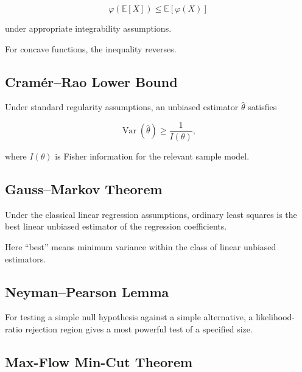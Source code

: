 \[
\boxed{
\varphi(
\mathbb{E}[X]
)
\leq
\mathbb{E}
[
\varphi(X)
]
}
\]

under appropriate integrability assumptions.

For concave functions, the inequality reverses.

\subsection{Cramér--Rao Lower Bound}
\label{subsec:cramer-rao-summary}

Under standard regularity assumptions, an unbiased estimator \(\hat\theta\)
satisfies

\[
\boxed{
\operatorname{Var}(\hat\theta)
\geq
\frac{
1
}{
I(\theta)
},
}
\]

where \(I(\theta)\) is Fisher information for the relevant sample model.

\subsection{Gauss--Markov Theorem}
\label{subsec:gauss-markov-summary}

Under the classical linear regression assumptions, ordinary least squares is
the best linear unbiased estimator of the regression coefficients.

Here ``best'' means minimum variance within the class of linear unbiased
estimators.

\subsection{Neyman--Pearson Lemma}
\label{subsec:neyman-pearson-summary}

For testing a simple null hypothesis against a simple alternative, a
likelihood-ratio rejection region gives a most powerful test of a specified
size.

\subsection{Max-Flow Min-Cut Theorem}
\label{subsec:max-flow-min-cut-summary}

